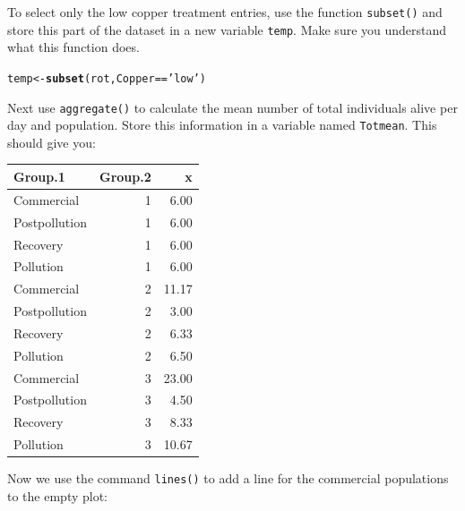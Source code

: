 \documentclass{article}\usepackage[]{graphicx}\usepackage[]{color}
\makeatletter
\newcommand{\hlstr}[1]{\textcolor[rgb]{0.192,0.494,0.8}{#1}}%
\newcommand{\hlopt}[1]{\textcolor[rgb]{0,0,0}{#1}}%
\newcommand{\hlstd}[1]{\textcolor[rgb]{0.345,0.345,0.345}{#1}}%
\newcommand{\hlkwb}[1]{\textcolor[rgb]{0.69,0.353,0.396}{#1}}%
\newcommand{\hlkwd}[1]{\textcolor[rgb]{0.737,0.353,0.396}{\textbf{#1}}}%
\newenvironment{kframe}{%
 \def\at@end@of@kframe{}%
 \ifinner\ifhmode%
  \def\at@end@of@kframe{\end{minipage}}%
  \begin{minipage}{\columnwidth}%
 \fi\fi%
 \def\FrameCommand##1{\hskip\@totalleftmargin \hskip-\fboxsep
 \colorbox{shadecolor}{##1}\hskip-\fboxsep
     \hskip-\linewidth \hskip-\@totalleftmargin \hskip\columnwidth}%
 \MakeFramed {\advance\hsize-\width
   \@totalleftmargin\z@ \linewidth\hsize
   \@setminipage}}%
 {\par\unskip\endMakeFramed%
 \at@end@of@kframe}
\newenvironment{knitrout}{}{} %
\makeatother
\begin{document}
To select only the low copper treatment entries, use the function \texttt{subset()} and store this part of the dataset in a new variable \texttt{temp}. Make sure you understand what this function does.
\begin{knitrout}
\color{fgcolor}\begin{kframe}
\begin{alltt}
\hlstd{temp}\hlkwb{<-}\hlkwd{subset}\hlstd{(rot,Copper}\hlopt{==}\hlstr{'low'}\hlstd{)}
\end{alltt}
\end{kframe}
\end{knitrout}

Next use \texttt{aggregate()} to calculate the mean number of total individuals alive per day and population. Store this information in a variable named \texttt{Tot\textunderscore mean}. This should give you:
\begin{center}
{\footnotesize
\begin{tabular}{lrr}
 Group.1 & Group.2 & x \\ 
  \hline
Commercial &   1 & 6.00 \\ 
  Postpollution &   1 & 6.00 \\ 
  Recovery &   1 & 6.00 \\ 
  Pollution &   1 & 6.00 \\ 
  Commercial &   2 & 11.17 \\ 
  Postpollution &   2 & 3.00 \\ 
  Recovery &   2 & 6.33 \\ 
  Pollution &   2 & 6.50 \\ 
  Commercial &   3 & 23.00 \\ 
  Postpollution &   3 & 4.50 \\ 
  Recovery &   3 & 8.33 \\ 
  Pollution &   3 & 10.67 \\ 
  \end{tabular}
}


\end{center}
Now we use the command \texttt{lines()} to add a line for the commercial populations to the empty plot:
\end{document}
